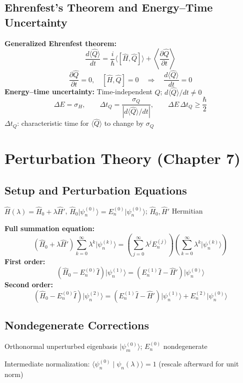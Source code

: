 \documentclass[12pt]{article}
\begin{document}
\subsection{Ehrenfest's Theorem and Energy--Time Uncertainty}

\textbf{Generalized Ehrenfest theorem:}
\[
  \frac{d\langle\hat Q\rangle}{dt}
  =\frac{i}{\hbar}\langle[\hat H,\hat Q]\rangle
   +\left\langle\frac{\partial\hat Q}{\partial t}\right\rangle
\]
\[
  \frac{\partial\hat Q}{\partial t}=0,\quad[\hat H,\hat Q]=0
  \quad\Longrightarrow\quad\frac{d\langle\hat Q\rangle}{dt}=0
\]
\textbf{Energy--time uncertainty:} Time-independent $\hat Q$; $d\langle\hat Q\rangle/dt\ne0$
\[
  \Delta E=\sigma_H,\qquad
  \Delta t_Q=\frac{\sigma_Q}{\left|d\langle\hat Q\rangle/dt\right|},\qquad
  \Delta E\,\Delta t_Q\geq\frac{\hbar}{2}
\]
$\Delta t_Q$: characteristic time for $\langle\hat Q\rangle$ to change by $\sigma_Q$

\section{Perturbation Theory (Chapter 7)}

\subsection{Setup and Perturbation Equations}

$\hat H(\lambda)=\hat H_0+\lambda\hat H'$, $\hat H_0\lvert\psi_n^{(0)}\rangle=E_n^{(0)}\lvert\psi_n^{(0)}\rangle$;
$\hat H_0,\hat H'$ Hermitian

\textbf{Full summation equation:}
\[
  (\hat H_0+\lambda\hat H')
  \sum_{k=0}^{\infty}\lambda^k\lvert\psi_n^{(k)}\rangle
  =\left(\sum_{j=0}^{\infty}\lambda^j E_n^{(j)}\right)
   \left(\sum_{k=0}^{\infty}\lambda^k\lvert\psi_n^{(k)}\rangle\right)
\]
\textbf{First order:}
\[
  (\hat H_0-E_n^{(0)}\hat I)\lvert\psi_n^{(1)}\rangle
  =(E_n^{(1)}\hat I-\hat H')\lvert\psi_n^{(0)}\rangle
\]
\textbf{Second order:}
\[
  (\hat H_0-E_n^{(0)}\hat I)\lvert\psi_n^{(2)}\rangle
  =(E_n^{(1)}\hat I-\hat H')\lvert\psi_n^{(1)}\rangle
   +E_n^{(2)}\lvert\psi_n^{(0)}\rangle
\]

\subsection{Nondegenerate Corrections}

Orthonormal unperturbed eigenbasis $\lvert\psi_m^{(0)}\rangle$;
$E_n^{(0)}$ nondegenerate
\par Intermediate normalization: $\langle\psi_n^{(0)}\mid\psi_n(\lambda)\rangle=1$
(rescale afterward for unit norm)
\end{document}
